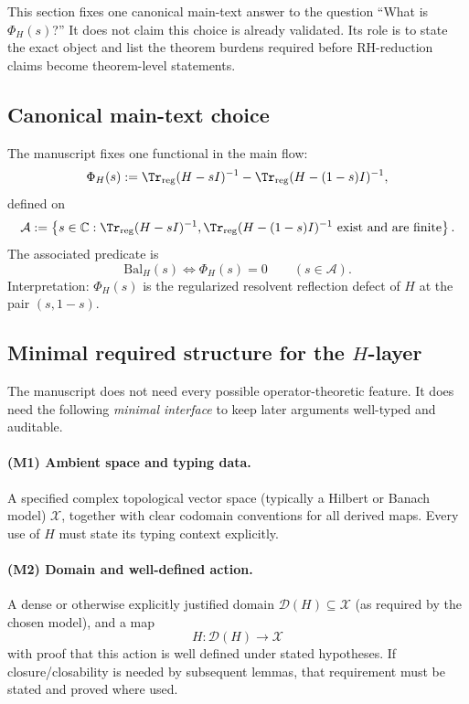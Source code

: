 This section fixes one canonical main-text answer to the question ``What is $\Phi_H(s)$?''
It does not claim this choice is already validated.
Its role is to state the exact object and list the theorem burdens required before RH-reduction claims become theorem-level statements.

\subsection*{Canonical main-text choice}
The manuscript fixes one functional in the main flow:
\[
\Phi_H(s):=\Tr_{\mathrm{reg}}(H-sI)^{-1}-\Tr_{\mathrm{reg}}(H-(1-s)I)^{-1},
\]
defined on
\[
\mathcal{A}:=
\left\{
s\in\C:
\Tr_{\mathrm{reg}}(H-sI)^{-1},\Tr_{\mathrm{reg}}(H-(1-s)I)^{-1}\ \text{exist and are finite}
\right\}.
\]
The associated predicate is
\[
\text{Bal}_H(s)\iff \Phi_H(s)=0 \qquad (s\in\mathcal{A}).
\]
Interpretation: $\Phi_H(s)$ is the regularized resolvent reflection defect of $H$ at the pair $(s,1-s)$.

\subsection*{Minimal required structure for the $H$-layer}
The manuscript does not need every possible operator-theoretic feature.
It does need the following \emph{minimal interface} to keep later arguments well-typed and auditable.

\paragraph{(M1) Ambient space and typing data.}
A specified complex topological vector space (typically a Hilbert or Banach model) $\mathcal{X}$, together with clear codomain conventions for all derived maps.
Every use of $H$ must state its typing context explicitly.

\paragraph{(M2) Domain and well-defined action.}
A dense or otherwise explicitly justified domain $\mathcal{D}(H)\subseteq\mathcal{X}$ (as required by the chosen model), and a map
\[
H:\mathcal{D}(H)\to\mathcal{X}
\]
with proof that this action is well defined under stated hypotheses.
If closure/closability is needed by subsequent lemmas, that requirement must be stated and proved where used.

